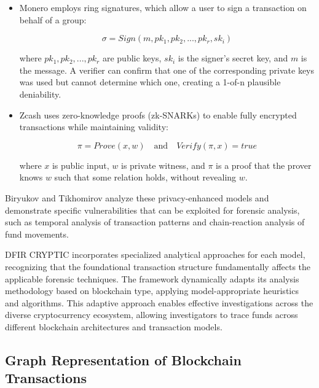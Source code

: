 \documentclass[conference]{IEEEtran}
\begin{document}
\begin{itemize}
    \begin{itemize}
        \item Monero employs ring signatures, which allow a user to sign a transaction on behalf of a group: 
        
        \begin{equation}
        \sigma = Sign(m, pk_1, pk_2, ..., pk_r, sk_i)
        \end{equation}
        
        where $pk_1, pk_2, ..., pk_r$ are public keys, $sk_i$ is the signer's secret key, and $m$ is the message. A verifier can confirm that one of the corresponding private keys was used but cannot determine which one, creating a 1-of-n plausible deniability.
        
        \item Zcash uses zero-knowledge proofs (zk-SNARKs) to enable fully encrypted transactions while maintaining validity:
        
        \begin{equation}
        \pi = Prove(x, w) \quad \text{and} \quad Verify(\pi, x) = true
        \end{equation}
        
        where $x$ is public input, $w$ is private witness, and $\pi$ is a proof that the prover knows $w$ such that some relation holds, without revealing $w$.
    \end{itemize}
    
    Biryukov and Tikhomirov \cite{biryukov2019} analyze these privacy-enhanced models and demonstrate specific vulnerabilities that can be exploited for forensic analysis, such as temporal analysis of transaction patterns and chain-reaction analysis of fund movements.
\end{itemize}

DFIR CRYPTIC incorporates specialized analytical approaches for each model, recognizing that the foundational transaction structure fundamentally affects the applicable forensic techniques. The framework dynamically adapts its analysis methodology based on blockchain type, applying model-appropriate heuristics and algorithms. This adaptive approach enables effective investigations across the diverse cryptocurrency ecosystem, allowing investigators to trace funds across different blockchain architectures and transaction models.

\subsection{Graph Representation of Blockchain Transactions}
\end{document}
